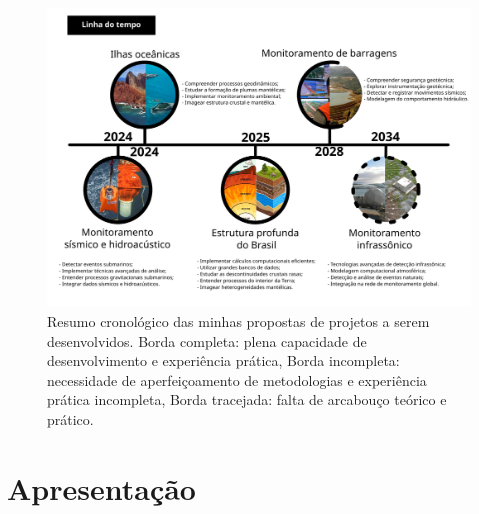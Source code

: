 \documentclass[10pt,a4paper,oneside]{book}
\begin{document}
\begin{landscape}
\begin{figure}[tb]
\begin{center}
\includegraphics[width=\pagewidth]{images/linha_do_projeto.png}
\end{center}
\caption*{Resumo cronológico das minhas propostas de projetos a serem desenvolvidos. Borda completa: plena capacidade de desenvolvimento e experiência prática, Borda incompleta: necessidade de aperfeiçoamento de metodologias e experiência prática incompleta, Borda tracejada: falta de arcabouço teórico e prático.}
\label{fig_tempo_linha}
\end{figure}
\end{landscape}
\tableofcontents

\mainmatter
\pagestyle{fancy}

\chapter{Apresentação}
\end{document}
